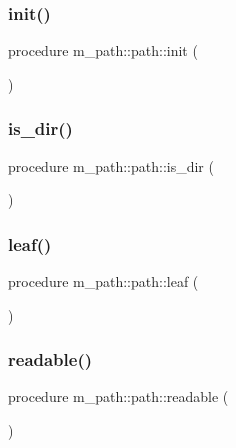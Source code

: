 \subsubsection{\texorpdfstring{init()}{init()}}
{\footnotesize\ttfamily procedure m\+\_\+path\+::path\+::init (\begin{DoxyParamCaption}{ }\end{DoxyParamCaption})\hspace{0.3cm}{\ttfamily [private]}}

\mbox{\label{structm__path_1_1path_ab9edbe441902b825c575010bd1b8a976}} 
\subsubsection{\texorpdfstring{is\+\_\+dir()}{is\_dir()}}
{\footnotesize\ttfamily procedure m\+\_\+path\+::path\+::is\+\_\+dir (\begin{DoxyParamCaption}{ }\end{DoxyParamCaption})\hspace{0.3cm}{\ttfamily [private]}}

\mbox{\label{structm__path_1_1path_ac48a286ac54ce081ff8f757bc7724c8d}} 
\subsubsection{\texorpdfstring{leaf()}{leaf()}}
{\footnotesize\ttfamily procedure m\+\_\+path\+::path\+::leaf (\begin{DoxyParamCaption}{ }\end{DoxyParamCaption})\hspace{0.3cm}{\ttfamily [private]}}

\mbox{\label{structm__path_1_1path_a77ab9b34be0db684654d1f1b375d2f9e}} 
\subsubsection{\texorpdfstring{readable()}{readable()}}
{\footnotesize\ttfamily procedure m\+\_\+path\+::path\+::readable (\begin{DoxyParamCaption}{ }\end{DoxyParamCaption})\hspace{0.3cm}{\ttfamily [private]}}

